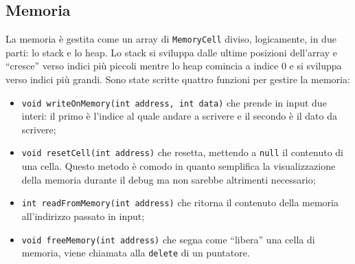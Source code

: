 \documentclass[../report.tex]{subfiles}
\begin{document}
\subsection{Memoria}\label{ss:memoria}
La memoria è gestita come un array di \verb|MemoryCell| diviso, logicamente, in due parti: lo stack e lo heap.
Lo stack si sviluppa dalle ultime posizioni dell'array e ``cresce'' verso indici più piccoli mentre lo heap comincia a indice 0 e si sviluppa verso indici più grandi.
Sono state scritte quattro funzioni per gestire la memoria:
\begin{itemize}
    \item \verb|void writeOnMemory(int address, int data)| che prende in input due interi: il primo è l'indice al quale andare a scrivere e il secondo è il dato da scrivere;
    \item \verb|void resetCell(int address)| che resetta, mettendo a \verb|null| il contenuto di una cella. Questo metodo è comodo in quanto semplifica la visualizzazione della memoria durante il debug ma non sarebbe altrimenti necessario;
    \item \verb|int readFromMemory(int address)| che ritorna il contenuto della memoria all'indirizzo passato in input;
    \item \verb|void freeMemory(int address)| che segna come ``libera'' una cella di memoria, viene chiamata alla \verb|delete| di un puntatore.
\end{itemize}
\end{document}
